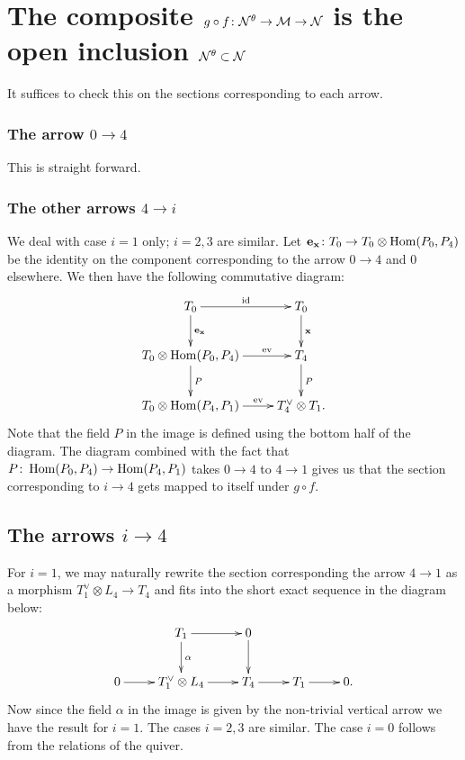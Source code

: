 \documentclass{amsart}
\theoremstyle{definition}
\begin{document}
\section{The composite $g \circ f \colon \mathcal{N}^\theta \rightarrow \mathcal{M} \rightarrow \mathcal{N}$ is the open inclusion $\mathcal{N}^\theta \subset \mathcal{N}$}

It suffices to check this on the sections corresponding to each arrow.

\subsubsection{The arrow $0 \rightarrow 4$}
This is straight forward.

\subsubsection{The other arrows $4 \rightarrow i$}
We deal with case $i=1$ only; $i=2,3$ are similar.
Let $\mathbf{e}_{\mathbf{x}} \colon T_0 \rightarrow  T_0 \otimes \operatorname{Hom}(P_0, P_4)$ be the identity on the component corresponding to the arrow $0 \rightarrow 4$ and 0 elsewhere.
We then have the following commutative diagram:
\begin{equation}
    \xymatrix{T_0 \ar[r]^{\text{id}} \ar[d]^{\bfe_\bfx} & T_0 \ar[d]^\bfx \\
    T_0 \otimes \Hom(P_0, P_4) \ar[r]^-{\text{ev}} \ar[d]^P & T_4 \ar[d]^P \\
    T_0 \otimes \Hom(P_4, P_1) \ar[r]^-{\text{ev}} &T_4^\vee \otimes T_1.
    }
\end{equation}
Note that the field $P$ in the image is defined using the bottom half of the diagram.
The diagram combined with the fact that $P \colon \operatorname{Hom}(P_0, P_4) \rightarrow \operatorname{Hom}(P_4, P_1)$ takes $0 \rightarrow 4$ to $4 \rightarrow 1$ gives us that the section corresponding to $i \rightarrow 4$ gets mapped to itself under $g \circ f$.

\subsection{The arrows $i \rightarrow 4$}

For $i =1$, we may naturally rewrite the section corresponding the arrow $4 \rightarrow 1$ as a morphism $T_1^\vee \otimes L_4 \rightarrow T_4$ and fits into the short exact sequence in the diagram below:
\begin{equation}
    \xymatrix{ & T_1 \ar[r] \ar[d]^\alpha & 0 \ar[d] & \\
    0 \ar[r] & T_1^\vee \otimes L_4 \ar[r] & T_4 \ar[r] & T_1 \ar[r] & 0.} 
\end{equation}
Now since the field $\alpha$ in the image is given by the non-trivial vertical arrow we have the result for $i=1$.
The cases $i=2,3$ are similar.
The case $i=0$ follows from the relations of the quiver.
\end{document}
